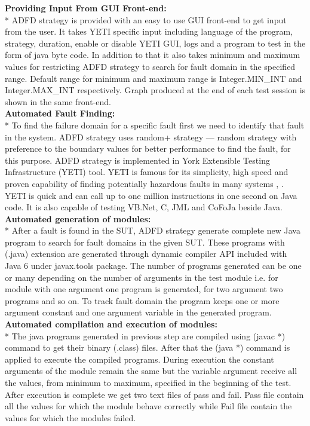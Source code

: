 \documentclass[runningheads,a4paper]{llncs}
\begin{document}
\noindent \textbf{Providing Input From GUI Front-end:}\\*
\indent ADFD strategy is provided with an easy to use GUI front-end to get input from the user. It takes YETI specific input including language of the program, strategy, duration, enable or disable YETI GUI, logs and a program to test in the form of java byte code. In addition to that it also takes minimum and maximum values for restricting ADFD strategy to search for fault domain in the specified range. Default range for minimum and maximum range is Integer.MIN\_INT and Integer.MAX\_INT respectively. Graph produced at the end of each test session is shown in the same front-end.\\

\noindent \textbf{Automated Fault Finding:}\\*
\indent To find the failure domain for a specific fault first we need to identify that fault in the system. ADFD strategy uses random+ strategy --- random strategy with preference to the boundary values for better performance to find the fault, for this purpose. ADFD strategy is implemented in York Extensible Testing Infrastructure (YETI) tool. YETI is famous for its simplicity, high speed and proven capability of finding potentially hazardous faults in many systems \cite{Oriol2011},  \cite{Oriol2012}. YETI is quick and can call up to one million instructions in one second on Java code. It is also capable of testing VB.Net, C, JML and CoFoJa beside Java. \\


\noindent \textbf{Automated generation of modules:}\\*
\indent  After a fault is found in the SUT, ADFD strategy generate complete new Java program to search for fault domains in the given SUT.  These programs with (.java) extension are generated through dynamic compiler API included with Java 6 under javax.tools package. The number of programs generated can be one or many depending on the number of arguments in the test module i.e. for module with one argument one program is generated, for two argument two programs and so on. To track fault domain the program keeps one or more argument constant and one argument variable in the generated program.\\

\noindent \textbf{Automated compilation and execution of modules:}\\*
\indent  The java programs generated in previous step are compiled using (javac *) command to get their binary (.class) files. After that the (java *) command is applied to execute the compiled programs. During execution the constant arguments of the module remain the same but the variable argument receive all the values, from minimum to maximum, specified in the beginning of the test. After execution is complete we get two text files of pass and fail. Pass file contain all the values for which the module behave correctly while Fail file contain the values for which the modules failed.\\
\end{document}
